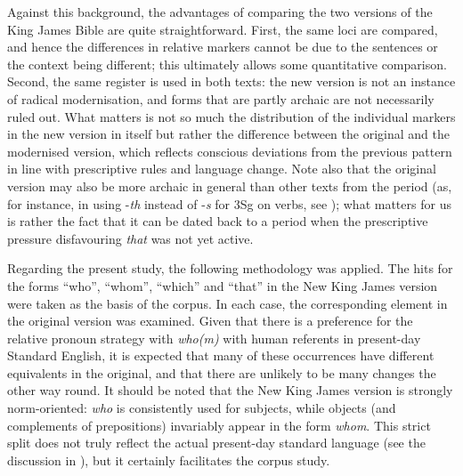 Against this background, the advantages of comparing the two versions of the King James Bible are quite straightforward. First, the same loci are compared, and hence the differences in relative markers cannot be due to the sentences or the context being different; this ultimately allows some quantitative comparison. Second, the same register is used in both texts: the new version is not an instance of radical modernisation, and forms that are partly archaic are not necessarily ruled out. What matters is not so much the distribution of the individual markers in the new version in itself but rather the difference between the original and the modernised version, which reflects conscious deviations from the previous pattern in line with prescriptive rules and language change. Note also that the original version may also be more archaic in general than other texts from the period (as, for instance, in using -\textit{th} instead of -\textit{s} for 3Sg on verbs, see \citealt[173]{vangelderen2014}); what matters for us is rather the fact that it can be dated back to a period when the prescriptive pressure disfavouring \textit{that} was not yet active.

Regarding the present study, the following methodology was applied. The hits for  the forms ``who'', ``whom'', ``which'' and ``that'' in the New King James version were taken as the basis of the corpus. In each case, the corresponding element in the original version was examined. Given that there is a preference for the relative pronoun strategy with \textit{who(m)} with human referents in present-day Standard English, it is expected that many of these occurrences have different equivalents in the original, and that there are unlikely to be many changes the other way round. It should be noted that the New King James version is strongly norm-oriented: \textit{who} is consistently used for subjects, while objects (and complements of prepositions) invariably appear in the form \textit{whom}. This strict split does not truly reflect the actual present-day standard language (see the discussion in ), but it certainly facilitates the corpus study.

